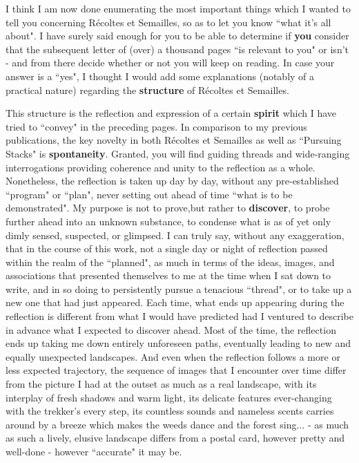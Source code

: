 I think I am now done enumerating the most important things which I wanted to tell you
concerning R\'ecoltes et Semailles, so as to let you know ``what it's all about". I have surely said enough for you to be able to determine if \textbf{you} consider that the subsequent letter of (over) a thousand pages ``is relevant to you" or isn't - and from there decide whether or not you will keep on reading. In case your answer is a ``yes", I thought I would add some explanations (notably of a practical nature) regarding the \textbf{structure} of R\'ecoltes et Semailles.

This structure is the reflection and expression of a certain \textbf{spirit} which I have tried to ``convey" in the preceding pages. In comparison to my previous publications, the key novelty in both R\'ecoltes et Semailles as well as ``Pursuing Stacks" is \textbf{spontaneity}. Granted, you will find guiding threads and wide-ranging interrogations providing coherence and unity to the reflection as a whole. Nonetheless, the reflection is taken up day by day, without any pre-established ``program" or ``plan", never setting out ahead of time ``what is to be demonstrated". My purpose is not to prove,but rather to \textbf{discover}, to probe further ahead into an unknown substance, to condense what is as of yet only dimly sensed, suspected, or glimpsed. I can truly say, without any exaggeration, that in the course of this work, not a single day or night of reflection passed within the realm of the ``planned", as much in terms of the ideas, images, and associations that presented themselves to me at the time when I sat down to write, and in so doing to persistently pursue a tenacious ``thread", or to take up a new one that had just appeared. Each time, what ends up appearing during the reflection is different from what I would have predicted had I ventured to describe in advance what I expected to discover ahead. Most of the time, the reflection ends up taking me down entirely unforeseen paths, eventually leading to new and equally unexpected landscapes. And even when the reflection follows a more or less expected trajectory, the sequence of images that I encounter over time differ from the picture I had at the outset as much as a real landscape, with its interplay of fresh shadows and warm light, its delicate features ever-changing with the trekker's every step, its countless sounds and nameless scents carries around by a breeze which makes the weeds dance and the forest sing... - as much as such a lively, elusive landscape differs from a postal card, however pretty and well-done - however ``accurate" it may be.

